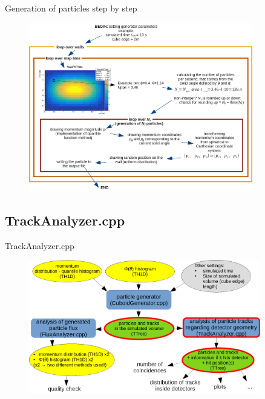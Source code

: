 \documentclass{beamer}
\begin{document}
\begin{frame}{Generation of particles step by step}
\begin{figure}
\includegraphics[width=0.87\textwidth]{images/alg.png}
\end{figure}
\end{frame}

\subsection{TrackAnalyzer.cpp}

\begin{frame}{TrackAnalyzer.cpp}
\begin{figure}
\includegraphics[width=0.9\textwidth]{images/sim_scheme_track.png}%
\end{figure}
\end{frame}
\end{document}
